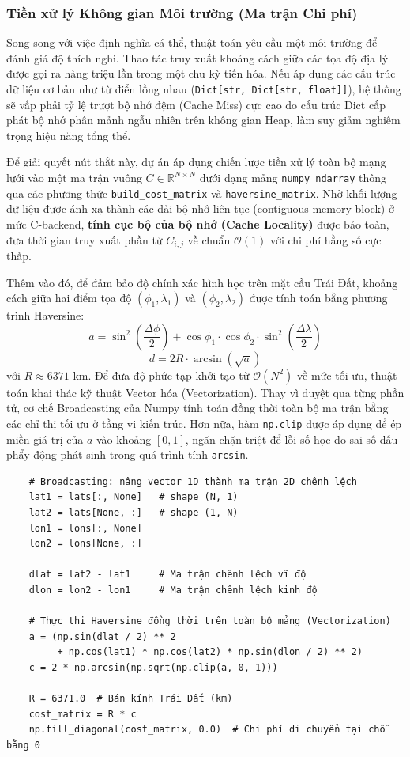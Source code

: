 \documentclass[12pt,a4paper]{article}
\numberwithin{figure}{subsection}
\begin{document}
\subsubsection{Tiền xử lý Không gian Môi trường (Ma trận Chi phí)}

Song song với việc định nghĩa cá thể, thuật toán yêu cầu một môi trường để đánh giá độ thích nghi. Thao tác truy xuất khoảng cách giữa các tọa độ địa lý được gọi ra hàng triệu lần trong một chu kỳ tiến hóa. Nếu áp dụng các cấu trúc dữ liệu cơ bản như từ điển lồng nhau (\texttt{Dict[str, Dict[str, float]]}), hệ thống sẽ vấp phải tỷ lệ trượt bộ nhớ đệm (Cache Miss) cực cao do cấu trúc Dict cấp phát bộ nhớ phân mảnh ngẫu nhiên trên không gian Heap, làm suy giảm nghiêm trọng hiệu năng tổng thể.

Để giải quyết nút thắt này, dự án áp dụng chiến lược tiền xử lý toàn bộ mạng lưới vào một ma trận vuông $C \in \mathbb{R}^{N \times N}$ dưới dạng mảng \texttt{numpy ndarray} thông qua các phương thức \texttt{build\_cost\_matrix} và \texttt{haversine\_matrix}. Nhờ khối lượng dữ liệu được ánh xạ thành các dải bộ nhớ liên tục (contiguous memory block) ở mức C-backend, \textbf{tính cục bộ của bộ nhớ (Cache Locality)} được bảo toàn, đưa thời gian truy xuất phần tử $C_{i,j}$ về chuẩn $\mathcal{O}(1)$ với chi phí hằng số cực thấp.

Thêm vào đó, để đảm bảo độ chính xác hình học trên mặt cầu Trái Đất, khoảng cách giữa hai điểm tọa độ $(\phi_1, \lambda_1)$ và $(\phi_2, \lambda_2)$ được tính toán bằng phương trình Haversine:
\[ a = \sin^2\!\left(\dfrac{\Delta\phi}{2}\right) + \cos\phi_1 \cdot \cos\phi_2 \cdot \sin^2\!\left(\dfrac{\Delta\lambda}{2}\right) \]
\[ d = 2R \cdot \arcsin(\sqrt{a}) \]
với $R \approx 6371$ km. Để đưa độ phức tạp khởi tạo từ $\mathcal{O}(N^2)$ về mức tối ưu, thuật toán khai thác kỹ thuật Vector hóa (Vectorization). Thay vì duyệt qua từng phần tử, cơ chế Broadcasting của Numpy tính toán đồng thời toàn bộ ma trận bằng các chỉ thị tối ưu ở tầng vi kiến trúc. Hơn nữa, hàm \texttt{np.clip} được áp dụng để ép miền giá trị của $a$ vào khoảng $[0, 1]$, ngăn chặn triệt để lỗi số học do sai số dấu phẩy động phát sinh trong quá trình tính \texttt{arcsin}.

\begin{verbatim}
    # Broadcasting: nâng vector 1D thành ma trận 2D chênh lệch
    lat1 = lats[:, None]   # shape (N, 1)
    lat2 = lats[None, :]   # shape (1, N)
    lon1 = lons[:, None]
    lon2 = lons[None, :]

    dlat = lat2 - lat1     # Ma trận chênh lệch vĩ độ
    dlon = lon2 - lon1     # Ma trận chênh lệch kinh độ

    # Thực thi Haversine đồng thời trên toàn bộ mảng (Vectorization)
    a = (np.sin(dlat / 2) ** 2
         + np.cos(lat1) * np.cos(lat2) * np.sin(dlon / 2) ** 2)
    c = 2 * np.arcsin(np.sqrt(np.clip(a, 0, 1)))

    R = 6371.0  # Bán kính Trái Đất (km)
    cost_matrix = R * c
    np.fill_diagonal(cost_matrix, 0.0)  # Chi phí di chuyển tại chỗ bằng 0
\end{verbatim}
\end{document}

